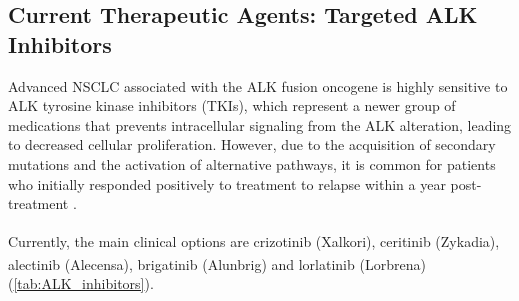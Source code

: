 \subsection{Current Therapeutic Agents: Targeted ALK Inhibitors}

Advanced NSCLC associated with the ALK fusion oncogene is highly sensitive to ALK tyrosine kinase inhibitors (TKIs), which represent a newer group of medications that prevents intracellular signaling from the ALK alteration, leading to decreased cellular proliferation. However, due to the acquisition of secondary mutations and the activation of alternative pathways, it is common for patients who initially responded positively to treatment to relapse within a year post-treatment \cite{NSCLC_therapies}. 

Currently, the main clinical options are crizotinib (Xalkori\textsuperscript\textregistered{}), ceritinib (Zykadia\textsuperscript\textregistered{}), alectinib (Alecensa\textsuperscript\textregistered{}), brigatinib (Alunbrig\textsuperscript\textregistered{}) and lorlatinib (Lorbrena\textsuperscript\textregistered{}) (\autoref{tab:ALK_inhibitors}).

